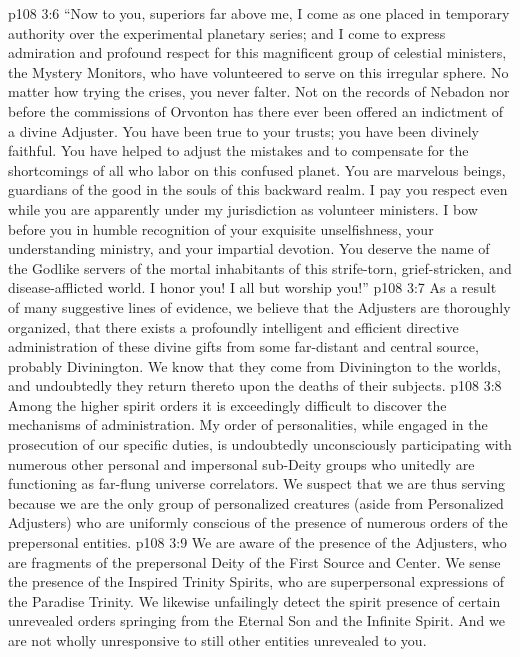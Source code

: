 \vs p108 3:6 “Now to you, superiors far above me, I come as one placed in temporary authority over the experimental planetary series; and I come to express admiration and profound respect for this magnificent group of celestial ministers, the Mystery Monitors, who have volunteered to serve on this irregular sphere. No matter how trying the crises, you never falter. Not on the records of Nebadon nor before the commissions of Orvonton has there ever been offered an indictment of a divine Adjuster. You have been true to your trusts; you have been divinely faithful. You have helped to adjust the mistakes and to compensate for the shortcomings of all who labor on this confused planet. You are marvelous beings, guardians of the good in the souls of this backward realm. I pay you respect even while you are apparently under my jurisdiction as volunteer ministers. I bow before you in humble recognition of your exquisite unselfishness, your understanding ministry, and your impartial devotion. You deserve the name of the Godlike servers of the mortal inhabitants of this strife\hyp{}torn, grief\hyp{}stricken, and disease\hyp{}afflicted world. I honor you! I all but worship you!”
\vs p108 3:7 \pc As a result of many suggestive lines of evidence, we believe that the Adjusters are thoroughly organized, that there exists a profoundly intelligent and efficient directive administration of these divine gifts from some far\hyp{}distant and central source, probably Divinington. We know that they come from Divinington to the worlds, and undoubtedly they return thereto upon the deaths of their subjects.
\vs p108 3:8 Among the higher spirit orders it is exceedingly difficult to discover the mechanisms of administration. My order of personalities, while engaged in the prosecution of our specific duties, is undoubtedly unconsciously participating with numerous other personal and impersonal sub\hyp{}Deity groups who unitedly are functioning as far\hyp{}flung universe correlators. We suspect that we are thus serving because we are the only group of personalized creatures (aside from Personalized Adjusters) who are uniformly conscious of the presence of numerous orders of the prepersonal entities.
\vs p108 3:9 We are aware of the presence of the Adjusters, who are fragments of the prepersonal Deity of the First Source and Center. We sense the presence of the Inspired Trinity Spirits, who are superpersonal expressions of the Paradise Trinity. We likewise unfailingly detect the spirit presence of certain unrevealed orders springing from the Eternal Son and the Infinite Spirit. And we are not wholly unresponsive to still other entities unrevealed to you.
